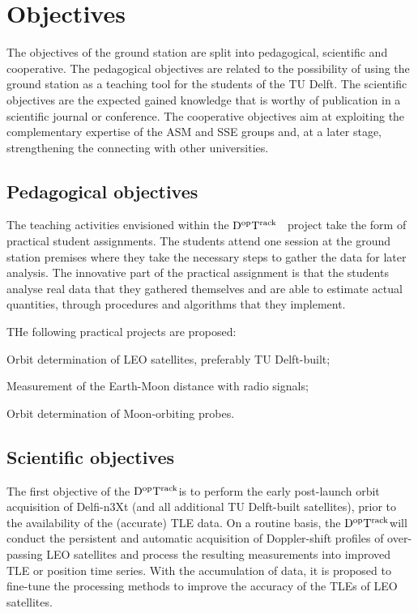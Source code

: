 \documentclass[11pt,a4paper,oneside]{article}
\newcommand{\GroundStationName}{${\rm D^{\rm op}T^{\rm rack}}$}
\newcommand{\listskip}{0pt}
\newenvironment{itemize*}
{\begin{itemize}
  \setlength{\itemsep}{\listskip}
  \setlength{\parskip}{\listskip}
  \setlength{\parsep}{\listskip}}
{\end{itemize}}
\begin{document}
\section{Objectives}

The objectives of the ground station are split into pedagogical, scientific and cooperative. The pedagogical objectives are related to the possibility of using the ground station as a teaching tool for the students of the TU Delft. The scientific objectives are the expected gained knowledge that is worthy of publication in a scientific journal or conference. The cooperative objectives aim at exploiting the complementary expertise of the \ac{ASM} and \ac{SSE} groups and, at a later stage, strengthening the connecting with other universities.



\subsection{Pedagogical objectives}

The teaching activities envisioned within the \GroundStationName~ project take the form of practical student assignments. The students attend one session at the ground station premises where they take the necessary steps to gather the data for later analysis. The innovative part of the practical assignment is that the students analyse real data that they gathered themselves and are able to estimate actual quantities, through procedures and algorithms that they implement.

THe following practical projects are proposed:

\begin{itemize*}
\item Orbit determination of \ac{LEO} satellites, preferably TU Delft-built;
\item Measurement of the Earth-Moon distance with radio signals;
\item Orbit determination of Moon-orbiting probes.
\end{itemize*}



\subsection{Scientific objectives}

The first objective of the \GroundStationName is to perform the early post-launch orbit acquisition of Delfi-n3Xt (and all additional TU Delft-built satellites), prior to the availability of the (accurate) \ac{TLE} data. On a routine basis, the \GroundStationName will conduct the persistent and automatic acquisition of Doppler-shift profiles of over-passing \ac{LEO} satellites and process the resulting measurements into improved \ac{TLE} or position time series. With the accumulation of data, it is proposed to fine-tune the processing methods to improve the accuracy of the \acp{TLE} of \ac{LEO} satellites.
\end{document}
